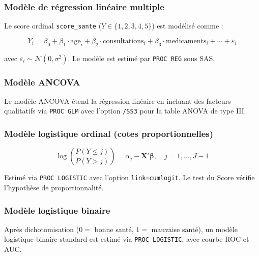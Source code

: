 \documentclass[11pt,a4paper]{memoirerecherche}
\begin{document}
\hypertarget{moduxe8le-de-ruxe9gression-linuxe9aire-multiple}{%
\subsubsection{Modèle de régression linéaire multiple}\label{moduxe8le-de-ruxe9gression-linuxe9aire-multiple}}

Le score ordinal \texttt{score\_sante} (\(Y \in \{1, 2, 3, 4, 5\}\)) est modélisé comme :

\[Y_i = \beta_0 + \beta_1 \cdot \text{age}_i + \beta_2 \cdot \text{consultations}_i + \beta_3 \cdot \text{medicaments}_i + \cdots + \varepsilon_i\]

avec \(\varepsilon_i \sim \mathcal{N}(0, \sigma^2)\). Le modèle est estimé par \texttt{PROC\ REG} sous SAS.

\hypertarget{moduxe8le-ancova}{%
\subsubsection{Modèle ANCOVA}\label{moduxe8le-ancova}}

Le modèle ANCOVA étend la régression linéaire en incluant des facteurs qualitatifs via \texttt{PROC\ GLM} avec l'option \texttt{/SS3} pour la table ANOVA de type III.

\hypertarget{moduxe8le-logistique-ordinal-cotes-proportionnelles}{%
\subsubsection{Modèle logistique ordinal (cotes proportionnelles)}\label{moduxe8le-logistique-ordinal-cotes-proportionnelles}}

\[\log\left(\frac{P(Y \leq j)}{P(Y > j)}\right) = \alpha_j - \mathbf{X}' \boldsymbol{\beta}, \quad j = 1, \ldots, J-1\]

Estimé via \texttt{PROC\ LOGISTIC} avec l'option \texttt{link=cumlogit}. Le test du Score vérifie l'hypothèse de proportionnalité.

\hypertarget{moduxe8le-logistique-binaire}{%
\subsubsection{Modèle logistique binaire}\label{moduxe8le-logistique-binaire}}

Après dichotomisation (\(0 =\) bonne santé, \(1 =\) mauvaise santé), un modèle logistique binaire standard est estimé via \texttt{PROC\ LOGISTIC}, avec courbe ROC et AUC.
\end{document}
